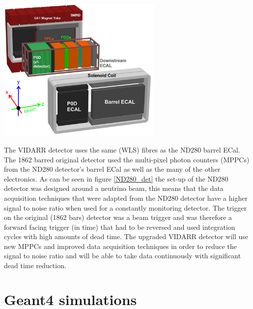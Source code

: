 \documentclass[12pt,a4paper]{article}
\newenvironment{Figure}
  {\par\medskip\noindent\minipage{\linewidth}}
  {\endminipage\par\medskip}
\begin{document}
\begin{Figure}
 \centering
 \includegraphics[height=71mm]{ND280_detector.png}
 \label{ND280_det}
\end{Figure}

The VIDARR detector uses the same (WLS) fibres as the ND280 barrel ECal. The 1862 barred original detector used the multi-pixel photon counters (MPPCs) \cite{MPPC_t2k} from the ND280 detector's barrel ECal \cite{t2k_ecal} as well as the many of the other electronics. As can be seen in figure \ref{ND280_det} the set-up of the ND280 detector was designed around a neutrino beam, this means that the data acquisition  techniques that were adapted from the ND280 detector have a higher signal to noise ratio when used for a constantly monitoring detector. The trigger on the original (1862 bars) detector was a beam trigger and was therefore a forward facing trigger (in time) that had to be reversed and used integration cycles with high amounts of dead time. The upgraded  VIDARR detector will use new MPPCs and improved data acquisition techniques in order to reduce the signal to noise ratio and will be able to take data continuously with significant dead time reduction. 


\section{Geant4 simulations}
\end{document}
